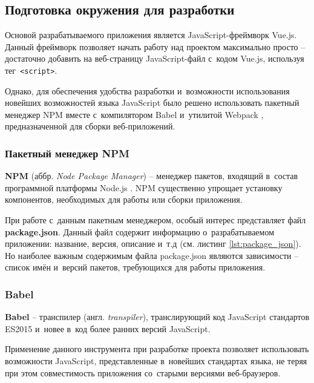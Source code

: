 
\subsection{Подготовка окружения для разработки}

Основой разрабатываемого приложения является JavaScript-фреймворк Vue.js. Данный фреймворк позволяет начать работу над проектом максимально просто -- достаточно добавить на веб-страницу JavaScript-файл с~кодом Vue.js, используя тег \,\verb|<script>|.

Однако, для обеспечения удобства разработки и~возможности использования новейших возможностей языка JavaScript было решено использовать пакетный менеджер NPM \cite{NPM} вместе с~компилятором Babel \cite{Babel} и~утилитой Webpack \cite{Webpack}, предназначенной для сборки веб-приложений.


\subsubsection{Пакетный менеджер NPM}

\textbf{NPM} (аббр. \emph{Node Package Manager}) -- менеджер пакетов, входящий в~состав программной платформы Node.js \cite{NodeJS}. NPM существенно упрощает установку компонентов, необходимых для работы или сборки приложения.

При работе с~данным пакетным менеджером, особый интерес представляет файл \textbf{package.json}. Данный файл содержит информацию о~разрабатываемом приложении: название, версия, описание и~т.д (см. листинг \ref{lst:package_json}). Но наиболее важным содержимым файла package.json являются зависимости -- список имён и~версий пакетов, требующихся для работы приложения.


\subsubsection{Babel}

\textbf{Babel} -- транспилер (англ. \emph{transpiler}), транслирующий код JavaScript стандартов ES2015 и~новее \cite{ecma262} в~код более ранних версий JavaScript.

Применение данного инструмента при разработке проекта позволяет использовать возможности JavaScript, представленные в~новейших стандартах языка, не теряя при этом совместимость приложения со~старыми версиями веб-браузеров.




